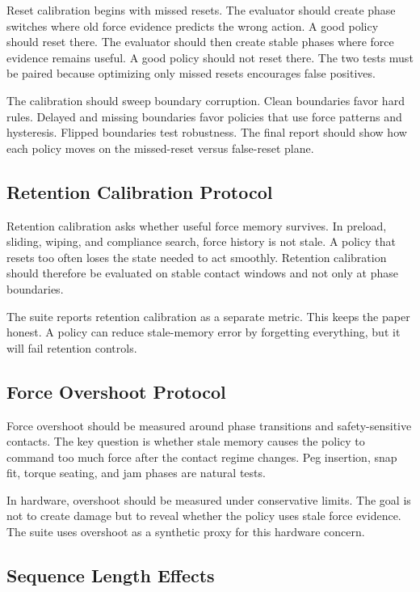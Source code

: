 \documentclass{article}
\begin{document}
Reset calibration begins with missed resets. The evaluator should create phase
switches where old force evidence predicts the wrong action. A good policy
should reset there. The evaluator should then create stable phases where force
evidence remains useful. A good policy should not reset there. The two tests
must be paired because optimizing only missed resets encourages false positives.

The calibration should sweep boundary corruption. Clean boundaries favor hard
rules. Delayed and missing boundaries favor policies that use force patterns
and hysteresis. Flipped boundaries test robustness. The final report should
show how each policy moves on the missed-reset versus false-reset plane.

\subsection{Retention Calibration Protocol}

Retention calibration asks whether useful force memory survives. In preload,
sliding, wiping, and compliance search, force history is not stale. A policy
that resets too often loses the state needed to act smoothly. Retention
calibration should therefore be evaluated on stable contact windows and not
only at phase boundaries.

The suite reports retention calibration as a separate metric. This keeps the
paper honest. A policy can reduce stale-memory error by forgetting everything,
but it will fail retention controls.

\subsection{Force Overshoot Protocol}

Force overshoot should be measured around phase transitions and safety-sensitive
contacts. The key question is whether stale memory causes the policy to command
too much force after the contact regime changes. Peg insertion, snap fit,
torque seating, and jam phases are natural tests.

In hardware, overshoot should be measured under conservative limits. The goal
is not to create damage but to reveal whether the policy uses stale force
evidence. The suite uses overshoot as a synthetic proxy for this hardware
concern.

\subsection{Sequence Length Effects}
\end{document}

